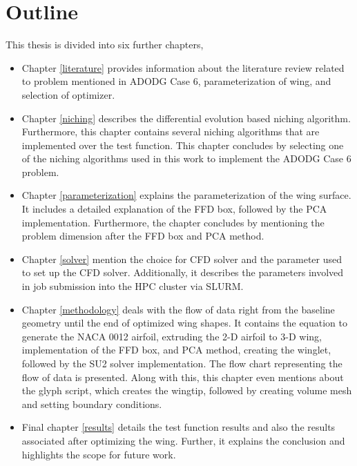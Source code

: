 \section{Outline}
This thesis is divided into six further chapters,
\begin{itemize}
\item Chapter \ref{literature} provides information about the literature review related to problem mentioned in ADODG Case 6, parameterization of wing, and selection of optimizer.
\item Chapter \ref{niching} describes the differential evolution based niching algorithm. Furthermore, this chapter contains several niching algorithms that are implemented over the test function. This chapter concludes by selecting one of the niching algorithms used in this work to implement the ADODG Case 6 problem. 
\item Chapter \ref{parameterization} explains the parameterization of the wing surface. It includes a detailed explanation of the FFD box, followed by the PCA implementation. Furthermore, the chapter concludes by mentioning the problem dimension after the FFD box and PCA method. 
\item Chapter \ref{solver} mention the choice for CFD solver and the parameter used to set up the CFD solver. Additionally, it describes the parameters involved in job submission into the HPC cluster via SLURM. 
\item Chapter \ref{methodology} deals with the flow of data right from the baseline geometry until the end of optimized wing shapes. It contains the equation to generate the NACA 0012 airfoil, extruding the 2-D airfoil to 3-D wing, implementation of the FFD box, and PCA method, creating the winglet, followed by the SU2 solver implementation. The flow chart representing the flow of data is presented. Along with this, this chapter even mentions about the glyph script, which creates the wingtip, followed by creating volume mesh and setting boundary conditions. 
\item  Final chapter \ref{results} details the test function results and also the results associated after optimizing the wing. Further, it explains the conclusion and highlights the scope for future work. 
\end{itemize}
